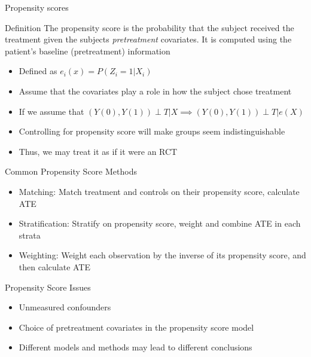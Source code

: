\begin{frame}{Propensity scores}
\begin{block}{Definition}
The propensity score is the probability that the subject received the treatment given the subjects \textit{pretreatment}
covariates. It is computed using the patient's baseline (pretreatment) information \cite{Rosenbaum1983}
\end{block}
 \begin{itemize}
  \item Defined as  $e_i(x)=P(Z_i =1 |X_i)$
  \item Assume that the covariates play a role in how the subject chose treatment
  \item If we assume that $(Y(0),Y(1))\perp T|X \implies (Y(0),Y(1))\perp T|e(X)$
  \item Controlling for propensity score will make groups seem indistinguishable
  \item Thus, we may treat it as if it were an RCT
 \end{itemize}

\end{frame}

\begin{frame}{Common Propensity Score Methods}
\begin{itemize}
 \item Matching: Match treatment and controls on their propensity score, calculate ATE
 \item Stratification: Stratify on propensity score, weight and combine ATE in each strata
 \item Weighting: Weight each observation by the inverse of its propensity score, and then calculate ATE
\end{itemize}
\end{frame}

\begin{frame}{Propensity Score Issues}
 \begin{itemize}
  \item Unmeasured confounders
  \item Choice of pretreatment covariates in the propensity score model
  \item Different models and methods may lead to different conclusions
 \end{itemize}

\end{frame}
